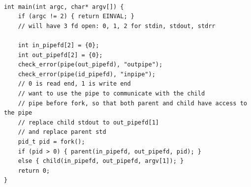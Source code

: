 \documentclass[../notes.tex]{subfiles}
\begin{document}
\begin{listing}[H]
\begin{verbatim}

int main(int argc, char* argv[]) {
    if (argc != 2) { return EINVAL; }
    // will have 3 fd open: 0, 1, 2 for stdin, stdout, stdrr

    int in_pipefd[2] = {0};
    int out_pipefd[2] = {0};
    check_error(pipe(out_pipefd), "outpipe");
    check_error(pipe(id_pipefd), "inpipe");
    // 0 is read end, 1 is write end
    // want to use the pipe to communicate with the child
    // pipe before fork, so that both parent and child have access to the pipe
    // replace child stdout to out_pipefd[1]
    // and replace parent std
    pid_t pid = fork();
    if (pid > 0) { parent(in_pipefd, out_pipefd, pid); }
    else { child(in_pipefd, out_pipefd, argv[1]); }
    return 0;
}
\end{verbatim}
\end{listing}
\end{document}
